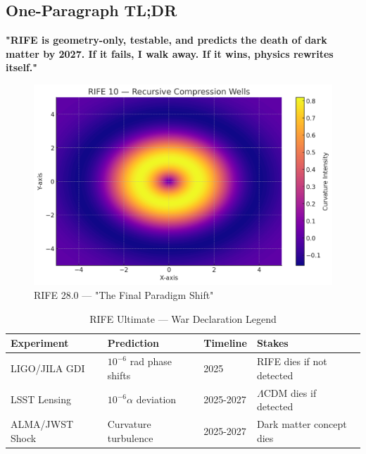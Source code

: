 \documentclass[11pt]{report}
\newcommand{\lamcdm}{$\Lambda$CDM}
\newcommand{\tenminus}{$10^{-6}$}
\newcommand{\tenminusalpha}{$10^{-6}\alpha$}
\begin{document}
\subsection*{One-Paragraph TL;DR}
\textbf{"RIFE is geometry-only, testable, and predicts the death of dark matter by 2027. If it fails, I walk away. If it wins, physics rewrites itself."}

\begin{figure}[ht]
  \centering
  \includegraphics[width=\textwidth]{recursive_engines/compression_wells.png}
  \caption{RIFE 28.0 — "The Final Paradigm Shift"}
\end{figure}

\begin{table}[ht]
\centering
\caption{RIFE Ultimate — War Declaration Legend}
\begin{tabular}{|l|l|l|l|}
\hline
\textbf{Experiment} & \textbf{Prediction} & \textbf{Timeline} & \textbf{Stakes} \\
\hline
LIGO/JILA GDI & \tenminus{} rad phase shifts & 2025 & RIFE dies if not detected \\
LSST Lensing & \tenminusalpha{} deviation & 2025-2027 & \lamcdm{} dies if detected \\
ALMA/JWST Shock & Curvature turbulence & 2025-2027 & Dark matter concept dies \\
\hline
\end{tabular}
\end{table}
\end{document}
